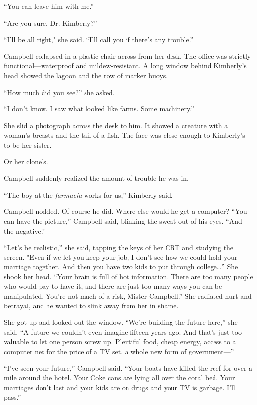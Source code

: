 ``You can leave him with me.''

``Are you sure, Dr. Kimberly?''

``I'll be all right," she said. ``I'll call you if there's any trouble.''

Campbell collapsed in a plastic chair across from her desk. The office was strictly functional---waterproof and mildew-resistant. A long window behind Kimberly's head showed the lagoon and the row of marker buoys.

``How much did you see?'' she asked.

``I don't know. I saw what looked like farms. Some machinery.''

She slid a photograph across the desk to him. It showed a creature with a woman's breasts and the tail of a fish. The face was close enough to Kimberly's to be her sister.

Or her clone's.

Campbell suddenly realized the amount of trouble he was in.

``The boy at the \textit{farmacia} works for us,'' Kimberly said.

Campbell nodded. Of course he did. Where else would he get a computer? ``You can have the picture,'' Campbell said, blinking the sweat out of his eyes. ``And the negative.''

``Let's be realistic,'' she said, tapping the keys of her CRT and studying the screen. "Even if we let you keep your job, I don't see how we could hold your marriage together. And then you have two kids to put through college\ldots'' She shook her head. ``Your brain is full of hot information. There are too many people who would pay to have it, and there are just too many ways you can be manipulated. You're not much of a risk, Mister Campbell.'' She radiated hurt and betrayal, and he wanted to slink away from her in shame.

She got up and looked out the window. ``We're building the future here,'' she said. ``A future we couldn't even imagine fifteen years ago. And that's just too valuable to let one person screw up. Plentiful food, cheap energy, access to a computer net for the price of a TV set, a whole new form of government---''

``I've seen your future,'' Campbell said. ``Your boats have killed the reef for over a mile around the hotel. Your Coke cans are lying all over the coral bed. Your marriages don't last and your kids are on drugs and your TV is garbage. I'll pass.''

